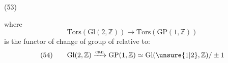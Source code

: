 (53)\quad
{}

where 
\[
\mathrm{Tors}(\mathrm{Gl}(2,\mathbb Z))\longrightarrow
\mathrm{Tors}(\mathrm{GP}(1,\mathbb Z))
\]
is the functor of change of group of  relative to:
\[
(54)\qquad
\mathrm{Gl}(2,\mathbb Z)\xrightarrow{\mathrm{can}}
\mathrm{GP}(1,\mathbb Z)\simeq
\mathrm{Gl}(\unsure{1|2},\mathbb Z)/\pm1
\]

